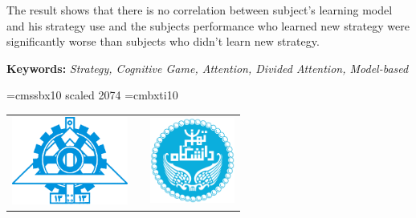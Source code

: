 \documentclass[twoside, a4paper,11pt]{book}
\numberwithin{equation}{chapter}
\numberwithin{table}{chapter}
\numberwithin{figure}{chapter}
\numberwithin{equation}{chapter}
\begin{document}
\begin{latin}
\begin{doublespace}
The result shows that there is no correlation between subject’s learning model and his strategy use and the subjects performance who learned new strategy were significantly worse than subjects who didn’t learn new strategy.

\end{doublespace}
{\par\vspace{2mm}}
\noindent\textbf{Keywords: }\textit{Strategy, Cognitive Game, Attention, Divided Attention, Model-based}

\newpage
\mbox{}


\font\titlefont=cmssbx10 scaled 2074
\font\supervisorfont=cmbxti10
\newpage
\thispagestyle{empty}
\begin{center}
\begin{tabular}{lp{7cm}r}
\includegraphics[width=3.8cm]{Figures/eng.png} & & \includegraphics[width=2.8cm]{Figures/ut.png} \\
\end{tabular}


\end{center}
\end{latin}
\end{document}
